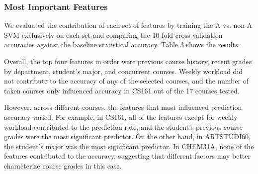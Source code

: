 \subsubsection{Most Important Features}

We evaluated the contribution of each set of features by training the A vs. non-A SVM exclusively on each set  and comparing the 10-fold cross-validation accuracies against the baseline statistical accuracy. Table 3 shows the results.

Overall, the top four features in order were previous course history, recent grades by department, student's major, and concurrent courses. Weekly workload did not contribute to the accuracy of any of the selected courses, and the number of taken courses only influenced accuracy in CS161 out of the 17 courses tested.

However, across different courses, the features that most influenced prediction accuracy varied. For example, in CS161, all of the features except for weekly workload contributed to the prediction rate, and the student's previous course grades were the most significant predictor. On the other hand, in ARTSTUDI60, the student's major was the most significant predictor. In CHEM31A, none of the features contributed to the accuracy, suggesting that different factors may better characterize course grades in this case.

